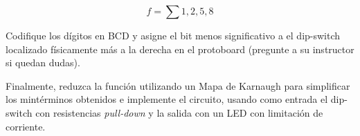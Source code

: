 $$ f = \sum{1,2,5,8} $$

Codifique los dígitos en BCD y asigne el bit menos significativo a el dip-switch localizado físicamente más a la derecha en el protoboard 
(pregunte a su instructor si quedan dudas).

\vspace{14pt}

Finalmente, reduzca la función utilizando un Mapa de Karnaugh para simplificar los mintérminos obtenidos e implemente el circuito, usando como entrada 
el dip-switch con resistencias \emph{pull-down} y la salida con un LED con limitación de corriente.

